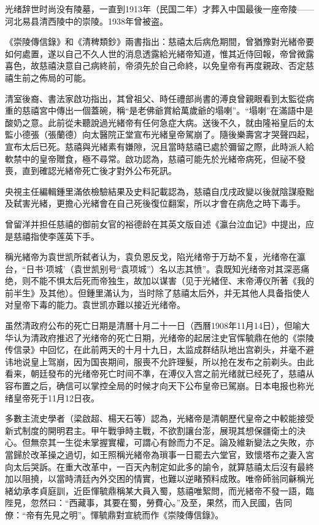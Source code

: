 光绪辞世时尚没有陵墓，一直到1913年（民国二年）才葬入中国最後一座帝陵——河北易县清西陵中的崇陵。1938年曾被盗。

《崇陵傳信錄》和《清稗類鈔》兩書指出：慈禧太后病危期間，曾猶豫對光緒帝要如何處置，遂以自己不久人世的消息透露給光緒帝知道，惟其近侍回報，帝曾微露喜色，故慈禧決意自己病終前，帝須先於自己命終，以免皇帝有再度親政、否定慈禧生前之佈局的可能。

清室後裔、書法家啟功指出，其曾祖父、時任禮部尚書的溥良曾親眼看到太監從病重的慈禧宮中傳出一個蓋碗，稱“是老佛爺賞給萬歲爺的塌喇”。“塌喇”在滿語中是酸奶之意。此前從未聽說過光緒帝有任何急症大病。送後不久，就由隆裕皇后的太監小德張（張蘭德）向太醫院正堂宣布光緒皇帝駕崩了。隨後樂壽宮才哭聲四起，宣布太后已死。慈禧與光緒素有嫌隙，況且當時慈禧已處於彌留之際，此時派人給軟禁中的皇帝贈食，極不尋常。啟功認為，慈禧可能先於光緒帝病死，但祕不發喪，直到確認光緒帝死亡後才對外公布死訊。

央視主任編輯鍾里滿依檢驗結果及史料記載認為，慈禧自戊戌政變以後就陰謀廢黜及弑害光緒，更擔心光緒會在自己死後復位翻案，所以才會在病危之時下毒手。

曾留洋并担任慈禧的御前女官的裕德龄在其英文版自述《瀛台泣血记》中提出，应是慈禧指使李莲英下手。

稱光緒帝为袁世凯所弑者认为，袁负恩反戈，陷光绪帝于万劫不复，光绪帝在瀛台，“日书‘项城’（袁世凯别号“袁项城”）名以志其愤”。袁既知光绪帝对其深恶痛绝，则不能不惧太后死而帝独生，故加以谋害（见于光緒侄、末帝溥仪所著《我的前半生》及其他）。但鍾里滿认为，当时除了慈禧太后外，并无其他人具备指使人对皇帝下毒的能力。袁世凯亦難以接近光绪帝。

虽然清政府公布的死亡日期是清曆十月二十一日（西曆1908年11月14日），但喻大华认为清政府推迟了光绪帝的死亡日期，光绪帝的起居注史官恽毓鼎在他的《崇陵传信录》中回忆，在此前两天的十月十九日，太监成群结队地出宫剃头，并毫不避讳地说皇上驾崩，因为国丧期间，服喪不允許理髮，所以抢在发布之前剃头。由此看来，朝廷發布的光绪帝死亡时间不準，在溥仪入宫之前光绪就已经死了，慈禧从容布置之后，确信可以掌控全局的时候才向天下公布皇帝已駕崩。日本电报也称光绪皇帝死于11月12日夜。

多數主流史學者（梁啟超、楊天石等）認為，光緒帝是清朝歷代皇帝之中較能接受新式制度的開明君主。甲午戰爭時主戰，不欲割讓台澎，展現其想保疆衛土的決心。但無奈其一生從未掌握實權，可謂心有餘而力不足。論及維新變法之失敗，亦當歸於改革操之過切，如王照稱光緒帝為瑣事一日罷去六堂官，致懷塔布之妻入宮向太后哭訴。在重大改革中，一百天內制定如此多的諭令，就算慈禧太后沒有最終加以阻撓，以當時清廷內外交困的情實，也難以逆睹預料成敗。唯帝師翁同龢稱光緒幼承孝貞庭訓，近臣惲毓鼎稱某大員入蜀，慈禧唯絮問，而光緒帝不發一語，臨陛見，忽然曰：“西藏事，其要在蜀，勞費心。”及至，果然，而入民國，告同僚：“帝有先見之明”。惲毓鼎對宣統而作《崇陵傳信錄》。

